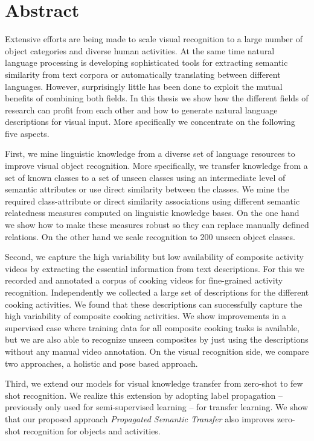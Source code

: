 \thispagestyle{plain}
\chapter*{\Huge Abstract} 
Extensive efforts are being made to scale visual recognition to a large number of object categories and diverse human activities. At the same time natural language processing is developing sophisticated tools for extracting semantic similarity from text corpora or automatically translating between different languages.
However, surprisingly little has been done to exploit the mutual benefits of combining both fields. In this thesis we show how the different fields of research can profit from each other and how to generate natural language descriptions for visual input. More specifically we concentrate on the following five aspects.

First, we mine linguistic knowledge from a diverse set of language resources to improve visual object recognition. More specifically, we transfer knowledge from a set of known classes to a set of unseen classes using an intermediate level of semantic attributes or use direct similarity between the classes. We mine the required class-attribute or direct similarity associations using different semantic relatedness measures computed on linguistic knowledge bases. On the one hand we show how to make these measures robust so they can replace manually defined relations. On the other hand we scale recognition to 200 unseen object classes.

Second, we capture the high variability but low availability of composite activity videos by extracting the essential information from  
text descriptions. For this we recorded and annotated a corpus of cooking videos for fine-grained activity recognition. Independently we collected a large set of descriptions for the different cooking activities.   
 We found that these descriptions can successfully capture the high variability of composite cooking activities. We show improvements in a supervised case where training data for all composite cooking tasks is available, but we are also able to recognize unseen composites by just using the descriptions without any manual video annotation. 
On the visual recognition side, we compare two approaches, a holistic and pose based approach. 

Third, we extend our models for visual knowledge transfer from zero-shot to few shot recognition. We realize this extension by adopting label propagation -- previously only used for semi-supervised learning -- for transfer learning. We show that our proposed approach \emph{Propagated Semantic Transfer} also improves zero-shot recognition for objects and activities.

